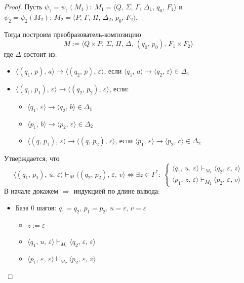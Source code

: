 \documentclass[a4paper,12pt]{article}
\theoremstyle{plain}
\theoremstyle{definition}
\theoremstyle{remark}
\begin{document}
\begin{proof}
	Пусть $\psi_1 = \psi_1(M_1):\: M_1 = \langle Q,\,\Sigma,\,\Gamma,\,\Delta_1,\,q_0,\,F_1\rangle$ и $\psi_2 = \psi_2(M_2) :\: M_2 = \langle P,\, \Gamma,\, \Pi,\, \Delta_2,\, p_0,\, F_2\rangle$.

	Тогда построим преобразователь-композицию
	\[
		M := \langle Q\times P,\, \Sigma,\, \Pi,\, \Delta,\, (q_0,\, p_0),\, F_1\times F_2\rangle
	\]
	где $\Delta$ состоит из:
	\begin{itemize}
		\item $\langle(q_1,\,p),\,a\rangle\to\langle(q_2,\,p),\,\varepsilon\rangle$, если $\langle q_1,\,a\rangle \to \langle q_2,\,\varepsilon\rangle \in \Delta_1$
		\item $\langle(q_1,\,p_1),\,\varepsilon\rangle\to\langle(q_2,\,p_2),\,\varepsilon\rangle$, если:
		      \begin{itemize}
			      \item $\langle q_1,\,\varepsilon \rangle\to\langle q_2,\,b\rangle \in \Delta_1$
			      \item $\langle p_1,\,b\rangle\to\langle p_2,\,\varepsilon\rangle \in \Delta_2$
			      \item $\langle(q,\,p_1),\,\varepsilon\rangle\to\langle(q,\,p_2),\,c\rangle$, если $\langle p_1,\,\varepsilon\rangle\to\langle p_2,\,c\rangle \in \Delta_2$
		      \end{itemize}
	\end{itemize}
	Утверждается, что
	\[
		\langle(q_1,\,p_1),\,u,\,\varepsilon\rangle\vdash_M\langle(q_2,\,p_2),\,\varepsilon,\,v\rangle\Leftrightarrow \exists z \in \Gamma^* :\: \begin{cases}
			\langle q_1,\,u,\,\varepsilon\rangle\vdash_{M_1}\langle q_2,\,\varepsilon,\,z\rangle \\
			\langle p_1,\,z,\,\varepsilon\rangle\vdash_{M_2}\langle p_2,\,\varepsilon,\, v\rangle
		\end{cases}
	\]
	В начале докажем $\Rightarrow$ индукцией по длине вывода:
	\begin{itemize}
		\item База 0 шагов: $q_1 = q_2,\, p_1 = p_2,\, u = \varepsilon,\, v = \varepsilon$
		      \begin{itemize}
			      \item $z := \varepsilon$
			      \item $\langle q_1,\,u,\,\varepsilon\rangle\vdash_{M_1}\langle q_2,\,\varepsilon,\,\varepsilon\rangle$
			      \item $\langle p_1,\,\varepsilon,\,\varepsilon\rangle\vdash_{M_2}\langle p_2,\,\varepsilon,\,v\rangle$

\end{itemize}
\end{itemize}
\end{proof}
\end{document}
